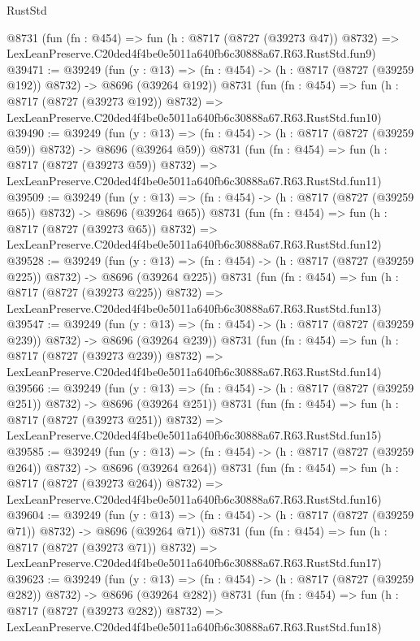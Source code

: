 \begin{lexlean}{RustStd}
\begin{coremodule}
    @8731
    (fun (fn : @454) =>
    fun (h : @8717 (@8727 (@39273 @47)) @8732) =>
    LexLeanPreserve.C20ded4f4be0e5011a640fb6c30888a67.R63.RustStd.fun9)
@39471 := @39249
    (fun (y : @13) => (fn : @454) -> (h : @8717 (@8727 (@39259 @192)) @8732) -> @8696 (@39264 @192))
    @8731
    (fun (fn : @454) =>
    fun (h : @8717 (@8727 (@39273 @192)) @8732) =>
    LexLeanPreserve.C20ded4f4be0e5011a640fb6c30888a67.R63.RustStd.fun10)
@39490 := @39249
    (fun (y : @13) => (fn : @454) -> (h : @8717 (@8727 (@39259 @59)) @8732) -> @8696 (@39264 @59))
    @8731
    (fun (fn : @454) =>
    fun (h : @8717 (@8727 (@39273 @59)) @8732) =>
    LexLeanPreserve.C20ded4f4be0e5011a640fb6c30888a67.R63.RustStd.fun11)
@39509 := @39249
    (fun (y : @13) => (fn : @454) -> (h : @8717 (@8727 (@39259 @65)) @8732) -> @8696 (@39264 @65))
    @8731
    (fun (fn : @454) =>
    fun (h : @8717 (@8727 (@39273 @65)) @8732) =>
    LexLeanPreserve.C20ded4f4be0e5011a640fb6c30888a67.R63.RustStd.fun12)
@39528 := @39249
    (fun (y : @13) => (fn : @454) -> (h : @8717 (@8727 (@39259 @225)) @8732) -> @8696 (@39264 @225))
    @8731
    (fun (fn : @454) =>
    fun (h : @8717 (@8727 (@39273 @225)) @8732) =>
    LexLeanPreserve.C20ded4f4be0e5011a640fb6c30888a67.R63.RustStd.fun13)
@39547 := @39249
    (fun (y : @13) => (fn : @454) -> (h : @8717 (@8727 (@39259 @239)) @8732) -> @8696 (@39264 @239))
    @8731
    (fun (fn : @454) =>
    fun (h : @8717 (@8727 (@39273 @239)) @8732) =>
    LexLeanPreserve.C20ded4f4be0e5011a640fb6c30888a67.R63.RustStd.fun14)
@39566 := @39249
    (fun (y : @13) => (fn : @454) -> (h : @8717 (@8727 (@39259 @251)) @8732) -> @8696 (@39264 @251))
    @8731
    (fun (fn : @454) =>
    fun (h : @8717 (@8727 (@39273 @251)) @8732) =>
    LexLeanPreserve.C20ded4f4be0e5011a640fb6c30888a67.R63.RustStd.fun15)
@39585 := @39249
    (fun (y : @13) => (fn : @454) -> (h : @8717 (@8727 (@39259 @264)) @8732) -> @8696 (@39264 @264))
    @8731
    (fun (fn : @454) =>
    fun (h : @8717 (@8727 (@39273 @264)) @8732) =>
    LexLeanPreserve.C20ded4f4be0e5011a640fb6c30888a67.R63.RustStd.fun16)
@39604 := @39249
    (fun (y : @13) => (fn : @454) -> (h : @8717 (@8727 (@39259 @71)) @8732) -> @8696 (@39264 @71))
    @8731
    (fun (fn : @454) =>
    fun (h : @8717 (@8727 (@39273 @71)) @8732) =>
    LexLeanPreserve.C20ded4f4be0e5011a640fb6c30888a67.R63.RustStd.fun17)
@39623 := @39249
    (fun (y : @13) => (fn : @454) -> (h : @8717 (@8727 (@39259 @282)) @8732) -> @8696 (@39264 @282))
    @8731
    (fun (fn : @454) =>
    fun (h : @8717 (@8727 (@39273 @282)) @8732) =>
    LexLeanPreserve.C20ded4f4be0e5011a640fb6c30888a67.R63.RustStd.fun18)

\end{coremodule}
\end{lexlean}
